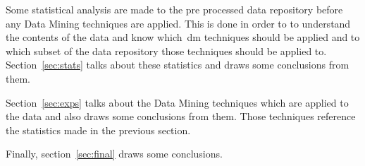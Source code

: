 Some statistical analysis are made to the pre processed data repository before
any Data Mining techniques are applied. This is done in order to to understand
the contents of the data and know which~\gls{dm} techniques should be applied
and to which subset of the data repository those techniques should be applied
to. Section~\ref{sec:stats} talks about these statistics and draws some
conclusions from them.

Section~\ref{sec:exps} talks about the Data Mining techniques which are applied
to the data and also draws some conclusions from them. Those techniques
reference the statistics made in the previous section.

Finally, section~\ref{sec:final} draws some conclusions.
